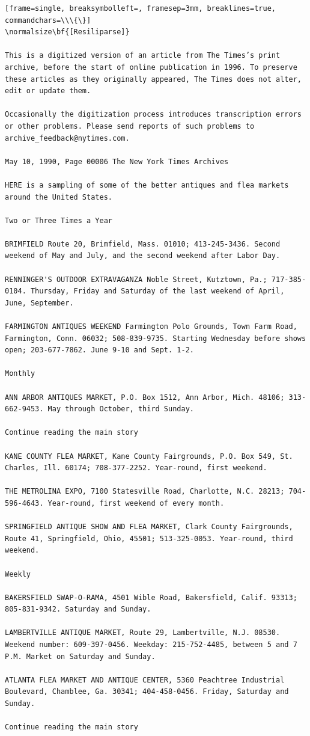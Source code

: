 \documentclass{article}
\begin{document}
\begin{tiny}
\begin{Verbatim}[frame=single, breaksymbolleft=, framesep=3mm, breaklines=true, commandchars=\\\{\}]
\normalsize\bf{[Resiliparse]}

This is a digitized version of an article from The Times’s print archive, before the start of online publication in 1996. To preserve these articles as they originally appeared, The Times does not alter, edit or update them.

Occasionally the digitization process introduces transcription errors or other problems. Please send reports of such problems to archive_feedback@nytimes.com.

May 10, 1990, Page 00006 The New York Times Archives

HERE is a sampling of some of the better antiques and flea markets around the United States.

Two or Three Times a Year

BRIMFIELD Route 20, Brimfield, Mass. 01010; 413-245-3436. Second weekend of May and July, and the second weekend after Labor Day.

RENNINGER'S OUTDOOR EXTRAVAGANZA Noble Street, Kutztown, Pa.; 717-385-0104. Thursday, Friday and Saturday of the last weekend of April, June, September.

FARMINGTON ANTIQUES WEEKEND Farmington Polo Grounds, Town Farm Road, Farmington, Conn. 06032; 508-839-9735. Starting Wednesday before shows open; 203-677-7862. June 9-10 and Sept. 1-2.

Monthly

ANN ARBOR ANTIQUES MARKET, P.O. Box 1512, Ann Arbor, Mich. 48106; 313-662-9453. May through October, third Sunday.

Continue reading the main story

KANE COUNTY FLEA MARKET, Kane County Fairgrounds, P.O. Box 549, St. Charles, Ill. 60174; 708-377-2252. Year-round, first weekend.

THE METROLINA EXPO, 7100 Statesville Road, Charlotte, N.C. 28213; 704-596-4643. Year-round, first weekend of every month.

SPRINGFIELD ANTIQUE SHOW AND FLEA MARKET, Clark County Fairgrounds, Route 41, Springfield, Ohio, 45501; 513-325-0053. Year-round, third weekend.

Weekly

BAKERSFIELD SWAP-O-RAMA, 4501 Wible Road, Bakersfield, Calif. 93313; 805-831-9342. Saturday and Sunday.

LAMBERTVILLE ANTIQUE MARKET, Route 29, Lambertville, N.J. 08530. Weekend number: 609-397-0456. Weekday: 215-752-4485, between 5 and 7 P.M. Market on Saturday and Sunday.

ATLANTA FLEA MARKET AND ANTIQUE CENTER, 5360 Peachtree Industrial Boulevard, Chamblee, Ga. 30341; 404-458-0456. Friday, Saturday and Sunday.

Continue reading the main story
\end{Verbatim}
\end{tiny}
\end{document}

